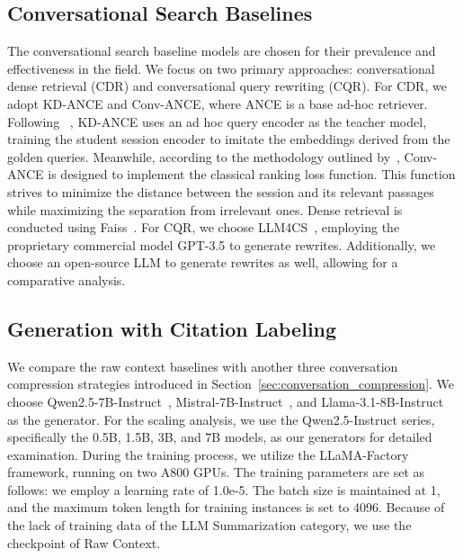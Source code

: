 \documentclass[11pt]{article}
\begin{document}
\subsection{Conversational Search Baselines}
The conversational search baseline models are chosen for their prevalence and effectiveness in the field. 
We focus on two primary approaches: conversational dense retrieval (CDR) and conversational query rewriting (CQR). 
For CDR, we adopt KD-ANCE and Conv-ANCE, where ANCE is a base ad-hoc retriever. Following ~\citet{yu_sigir21_cdr}, KD-ANCE uses an ad hoc query encoder as the teacher model, training the student session encoder to imitate the embeddings derived from the golden queries. Meanwhile, according to the methodology outlined by~\citep{Karpukhin_dpr_emnlp20,lin_emnlp21_cdr}, Conv-ANCE is designed to implement the classical ranking loss function. This function strives to minimize the distance between the session and its relevant passages while maximizing the separation from irrelevant ones.  Dense retrieval is conducted using Faiss~\cite{faiss}.
For CQR, we choose LLM4CS~\cite{mao_emnlp23_llm4cs}, employing the proprietary commercial model GPT-3.5 to generate rewrites. Additionally, we choose an open-source LLM to generate rewrites as well, allowing for a comparative analysis.

\subsection{Generation with Citation Labeling}
We compare the raw context baselines with another three conversation compression strategies introduced in Section~\ref{sec:conversation_compression}. We choose Qwen2.5-7B-Instruct~\citep{qwen2,qwen2.5}, 
Mistral-7B-Instruct~\citep{mistral}, and Llama-3.1-8B-Instruct~\citep{llama3} as the generator. For the scaling analysis, we use the Qwen2.5-Instruct series, specifically the 0.5B, 1.5B, 3B, and 7B models, as our generators for detailed examination. 
During the training process, we utilize the LLaMA-Factory~\citep{zheng2024llamafactory} framework, running on two A800 GPUs. The training parameters are set as follows: we employ a learning rate of 1.0e-5. The batch size is maintained at 1, and the maximum token length for training instances is set to 4096. Because of the lack of training data of the LLM Summarization category, we use the checkpoint of Raw Context.
\end{document}
